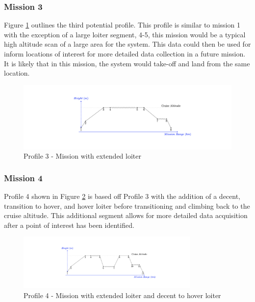 \subsubsection{Mission 3}
Figure \ref{fig:miss3} outlines the third potential profile. This profile is similar to mission 1 with the exception of a large loiter segment, 4-5, this mission would be a typical high altitude scan of a large area for the system. This data could then be used for inform locations of interest for more detailed data collection in a future mission. It is likely that in this mission, the system would take-off and land from the same location.

\begin{figure}[H]
    \centering
    \includegraphics[width=1\textwidth]{PrelimSizing/mission1.png}
    \caption{Profile 3 - Mission with extended loiter}
    \label{fig:miss3}
\end{figure}

\subsubsection{Mission 4}
Profile 4 shown in Figure \ref{fig:miss4} is based off Profile 3 with the addition of a decent, transition to hover, and hover loiter before transitioning and climbing back to the cruise altitude. This additional segment allows for more detailed data acquisition after a point of interest has been identified.

\begin{figure}[H]
    \centering
    \includegraphics[width=0.8\textwidth]{mission4.png}
    \caption{Profile 4 - Mission with extended loiter and decent to hover loiter}
    \label{fig:miss4}
\end{figure}

